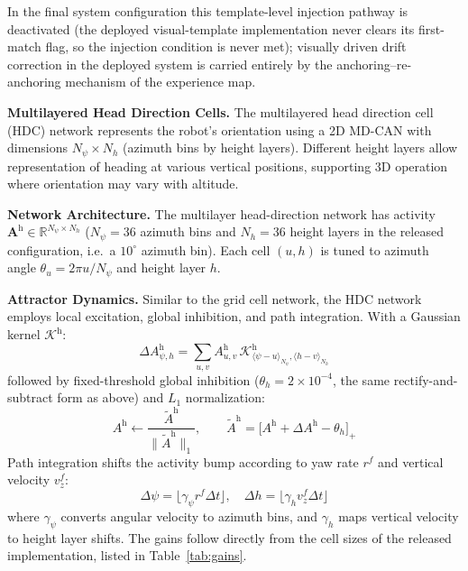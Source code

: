 In the final system configuration this template-level injection pathway is deactivated (the deployed visual-template implementation never clears its first-match flag, so the injection condition is never met); visually driven drift correction in the deployed system is carried entirely by the anchoring--re-anchoring mechanism of the experience map.

\textbf{Multilayered Head Direction Cells.} The multilayered head direction cell (HDC) network represents the robot's orientation using a 2D MD-CAN with dimensions $N_\psi \times N_h$ (azimuth bins by height layers). Different height layers allow representation of heading at various vertical positions, supporting 3D operation where orientation may vary with altitude.

\textbf{Network Architecture.} The multilayer head-direction network has activity $\mathbf{A}^\mathrm{h} \in \mathbb{R}^{N_\psi \times N_h}$ ($N_\psi = 36$ azimuth bins and $N_h = 36$ height layers in the released configuration, i.e.\ a $10^{\circ}$ azimuth bin). Each cell $(u, h)$ is tuned to azimuth angle $\theta_u = 2\pi u / N_\psi$ and height layer $h$.

\textbf{Attractor Dynamics.} Similar to the grid cell network, the HDC network employs local excitation, global inhibition, and path integration. With a Gaussian kernel $\mathcal{K}^\mathrm{h}$:
\begin{equation}
    \Delta A^\mathrm{h}_{\psi,h}=\sum_{u,v}A^\mathrm{h}_{u,v}\,\mathcal{K}^\mathrm{h}_{\langle \psi-u\rangle_{N_\psi},\langle h-v\rangle_{N_h}}
\end{equation}
followed by fixed-threshold global inhibition ($\theta_h = 2\times10^{-4}$, the same rectify-and-subtract form as above) and $L_1$ normalization:
\begin{equation}
    A^\mathrm{h}\leftarrow \frac{\tilde{A}^\mathrm{h}}{\lVert \tilde{A}^\mathrm{h}\rVert_1},\qquad \tilde{A}^\mathrm{h}=\big[A^\mathrm{h}+\Delta A^\mathrm{h}-\theta_h\big]_+
\end{equation}
Path integration shifts the activity bump according to yaw rate $r^f$ and vertical velocity $v^f_z$:
\begin{equation}
    \Delta\psi=\lfloor \gamma_\psi r^f \Delta t\rfloor,\quad \Delta h=\lfloor \gamma_h v^f_z \Delta t\rfloor
\end{equation}
where $\gamma_\psi$ converts angular velocity to azimuth bins, and $\gamma_h$ maps vertical velocity to height layer shifts. The gains follow directly from the cell sizes of the released implementation, listed in Table~\ref{tab:gains}.

